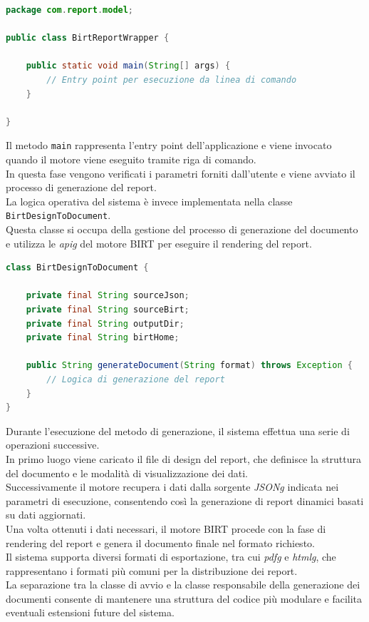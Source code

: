 \begin{lstlisting}[language=Java]
package com.report.model;

public class BirtReportWrapper {

    public static void main(String[] args) {
        // Entry point per esecuzione da linea di comando
    }

}
\end{lstlisting}

Il metodo \texttt{main} rappresenta l'entry point dell'applicazione e viene invocato quando il motore viene eseguito tramite riga di comando. \\
In questa fase vengono verificati i parametri forniti dall'utente e viene avviato il processo di generazione del report.\\
La logica operativa del sistema è invece implementata nella classe \texttt{BirtDesignToDocument}. \\
Questa classe si occupa della gestione del processo di generazione del documento e utilizza le \emph{\gls{apig}} del motore BIRT per eseguire il rendering del report.

\begin{lstlisting}[language=Java]
class BirtDesignToDocument {

    private final String sourceJson;
    private final String sourceBirt;
    private final String outputDir;
    private final String birtHome;

    public String generateDocument(String format) throws Exception {
        // Logica di generazione del report
    }
}
\end{lstlisting}

Durante l'esecuzione del metodo di generazione, il sistema effettua una serie di operazioni successive. \\
In primo luogo viene caricato il file di design del report, che definisce la struttura del documento e le modalità di visualizzazione dei dati. \\
Successivamente il motore recupera i dati dalla sorgente \emph{\gls{JSONg}} indicata nei parametri di esecuzione, consentendo così la generazione di report dinamici basati su dati aggiornati.\\
Una volta ottenuti i dati necessari, il motore BIRT procede con la fase di rendering del report e genera il documento finale nel formato richiesto.\\ 
Il sistema supporta diversi formati di esportazione, tra cui \emph{\gls{pdfg}} e \emph{\gls{htmlg}}, che rappresentano i formati più comuni per la distribuzione dei report.\\
La separazione tra la classe di avvio e la classe responsabile della generazione dei documenti consente di mantenere una struttura del codice più modulare e facilita eventuali estensioni future del sistema.


